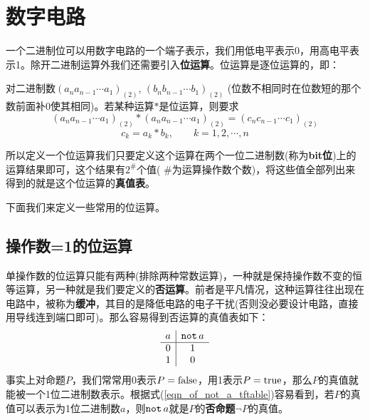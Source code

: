 \section*{数字电路}
\par 一个二进制位可以用数字电路的一个端子表示，我们用低电平表示0，用高电平表示1。除开二进制运算外我们还需要引入\textbf{位运算}。位运算是逐位运算的，即：
\begin{definition*}
    对二进制数$(a_na_{n-1}\cdots a_1)_{(2)}$, $(b_nb_{n-1}\cdots b_1)_{(2)}$ (位数不相同时在位数短的那个数前面补0使其相同)。若某种运算$*$是位运算，则要求
    $$(a_na_{n-1}\cdots a_1)_{(2)}*(a_na_{n-1}\cdots a_1)_{(2)}=(c_nc_{n-1}\cdots c_1)_{(2)}$$
    $$c_k=a_k*b_k,\qquad k=1,2,\cdots,n$$
\end{definition*}
\par 所以定义一个位运算我们只要定义这个运算在两个一位二进制数(称为\textbf{bit位})上的运算结果即可，这个结果有$2^\#$个值( $\#$为运算操作数个数)，将这些值全部列出来得到的就是这个位运算的\textbf{真值表}。
\par 下面我们来定义一些常用的位运算。
\subsection*{操作数=1的位运算}
\par 单操作数的位运算只能有两种(排除两种常数运算)，一种就是保持操作数不变的恒等运算，另一种就是我们要定义的\textbf{否运算}。前者是平凡情况，这种运算往往出现在电路中，被称为\textbf{缓冲}，其目的是降低电路的电子干扰(否则没必要设计电路，直接用导线连到端口即可)。那么容易得到否运算的真值表如下：
\begin{equation}\label{eqn_of_not_a_tftable}
    \begin{array}{c|c}
        a&\operatorname{\texttt{not}} a\\
        \hline
        0&1\\
        1&0\\
    \end{array}
\end{equation}
事实上对命题$P$，我们常常用0表示$P=\rm false$，用1表示$P=\rm true$，那么$P$的真值就能被一个1位二进制数表示。根据式(\ref{eqn_of_not_a_tftable})容易看到，若$P$的真值可以表示为1位二进制数$a$，则$\operatorname{\texttt{not}} a$就是$P$的\textbf{否命题}$\lnot P$的真值。
